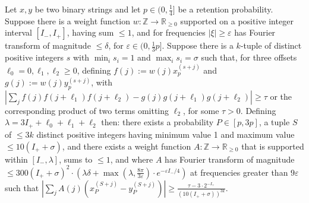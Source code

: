 \documentclass[11pt]{article}
\theoremstyle{plain}
\newcommand{\eps}{\varepsilon}
\begin{document}
\begin{lemma}\label{lem:three-to-one}
Let $x,y$ be two binary strings and let $p\in(0,\frac{1}{4}]$ be a retention probability.
Suppose there is a weight function $w:\mathbb{Z}\rightarrow\mathbb{R}_{\geq 0}$ supported on a positive integer interval $[I_-,I_+]$, having sum $\leq 1$, and for frequencies $|\xi|\geq \eps$ has Fourier transform of magnitude $\leq \delta$, for $\eps\in(0,\frac{1}{3}p]$. Suppose there is a $k$-tuple of distinct positive integers $s$ with $\min_i s_i=1$ and $\max_i s_i=\sigma$ such that, for three offsets $\ell_0=0,\ell_1,\ell_2\geq 0$, defining $f(j):=w(j) x_p^{(s+j)}$ and $g(j):=w(j) y_p^{(s+j)}$, with $|\sum_j f(j)f(j+\ell_1)f(j+\ell_2)-g(j)g(j+\ell_1)g(j+\ell_2)|\geq \tau$ or the corresponding product of two terms omitting $\ell_2$, for some $\tau>0$. Defining $\lambda=3I_++\ell_0+\ell_1+\ell_2$ then: there exists a probability $P\in[p,3p]$, a tuple $S$ of $\leq 3k$ distinct positive integers having minimum value 1 and maximum value $\leq 10(I_++\sigma)$, and there exists a weight function $A:\mathbb{Z}\rightarrow\mathbb{R}_{\geq 0}$ that is supported within $[I_-,\lambda]$, sums to $\leq 1$, and where $A$ has Fourier transform of magnitude $\leq 300 (I_++\sigma)^2\cdot\left(\lambda\delta+\max(\lambda,\frac{8\pi}{3\eps})\cdot e^{-\eps I_-/4}\right)$ at frequencies greater than $9\eps$ such that $|\sum_j A(j)(x_P^{(S+j)}-y_P^{(S+j)})|\geq \frac{\tau-3\cdot 2^{-I_+}}{(10(I_++\sigma))^{3k}}$.
\end{lemma}
\end{document}
